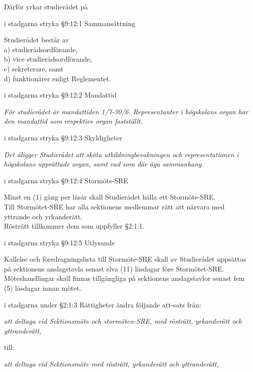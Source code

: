 \documentclass[../_main/handlingar.tex]{subfiles}
\begin{document}
Därför yrkar studierådet på
\begin{attsatser}
  \att i stadgarna stryka \S9:12:1 Sammansättning\par
  \begin{itshape}
    Studierådet består av\\
    a) studierådsordförande,\\
    b) vice studierådsordförande,\\
    c) sekreterare, samt\\
    d) funktionärer enligt Reglementet.
  \end{itshape}

  \newpage
  \att i stadgarna stryka \S9:12:2 Mandattid\par
  \emph{För studierådet är mandattiden 1/7-30/6. Representanter i högskolans organ har den mandattid som respektive organ fastställt.}

  \att i stadgarna stryka \S9:12:3 Skyldigheter\par
  \emph{Det åligger Studierådet att sköta utbildningbevakningen och representationen i högskolans upprättade organ, samt vad som där äga sammanhang.}

  \att i stadgarna stryka \S9:12:4 Stormöte-SRE\par
  \begin{itshape}
    Minst en (1) gång per läsår skall Studierådet hålla ett Stormöte-SRE.\\
    Till Stormötet-SRE har alla sektionens medlemmar rätt att närvara med yttrande och yrkanderätt.\\
    Rösträtt tillkommer dem som uppfyller \S2:1:1.
  \end{itshape}

  \att i stadgarna stryka \S9:12:5 Utlysande\par
  \begin{itshape}
    Kallelse och föredragningslista till Stormöte-SRE skall av Studierådet uppsättas på sektionens anslagstavla senast elva (11) läsdagar före Stormötet-SRE.\\
    Möteshandlingar skall finnas tillgängliga på sektionens anslagstavlor senast fem (5) läsdagar innan mötet.
  \end{itshape}

  \att i stadgarna under \S2:1:3 Rättigheter ändra följande att-sats från:\par
  \emph{att deltaga vid Sektionsmöte och stormöten-SRE, med rösträtt, yrkanderätt och yttranderätt,}\par
  till:\par
  \emph{att deltaga vid Sektionsmöte med rösträtt, yrkanderätt och yttranderätt,}


\end{attsatser}
\end{document}
